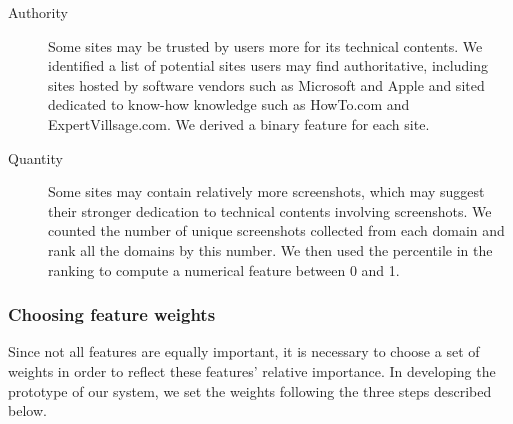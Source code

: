 \documentclass{www2010-submission}
\begin{document}
\begin{description}

\item[Authority] Some sites may be trusted by users more for its
  technical contents. We identified a list of potential sites users
  may find authoritative, including sites hosted by software vendors
  such as Microsoft and Apple and sited dedicated to know-how
  knowledge such as HowTo.com and ExpertVillsage.com. We derived a
  binary feature for each site.

\item[Quantity] Some sites may contain relatively more screenshots,
  which may suggest their stronger dedication to technical contents
  involving screenshots.  We counted the number of unique screenshots
  collected from each domain and rank all the domains by this
  number. We then used the percentile in the ranking to compute a
  numerical feature between 0 and 1.



\end{description}

\subsubsection{Choosing feature weights}

Since not all features are equally important, it is necessary to
choose a set of weights in order to reflect these features' relative
importance. In developing the prototype of our system, we set the
weights following the three steps described below.
\end{document}
